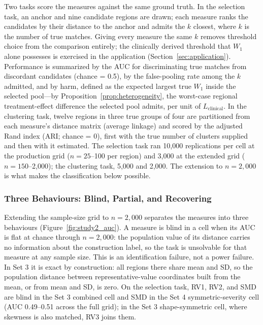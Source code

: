\documentclass[AMA,Times1COL]{WileyNJDv5}
\begin{document}
Two tasks score the measures against the same ground truth. In the selection task, an anchor and nine candidate regions are drawn; each measure ranks the candidates by their distance to the anchor and admits the $k$ closest, where $k$ is the number of true matches. Giving every measure the same $k$ removes threshold choice from the comparison entirely; the clinically derived threshold that $W_1$ alone possesses is exercised in the application (Section~\ref{sec:application}). Performance is summarized by the AUC for discriminating true matches from discordant candidates (chance = 0.5), by the false-pooling rate among the $k$ admitted, and by harm, defined as the expected largest true $W_1$ inside the selected pool---by Proposition~\ref{prop:heterogeneity}, the worst-case regional treatment-effect difference the selected pool admits, per unit of $L_{\text{clinical}}$. In the clustering task, twelve regions in three true groups of four are partitioned from each measure's distance matrix (average linkage) and scored by the adjusted Rand index (ARI; chance = 0), first with the true number of clusters supplied and then with it estimated. The selection task ran 10{,}000 replications per cell at the production grid ($n = 25$--100 per region) and 3{,}000 at the extended grid ($n = 150$--2{,}000); the clustering task, 5{,}000 and 2{,}000. The extension to $n = 2{,}000$ is what makes the classification below possible.

\subsubsection{Three Behaviours: Blind, Partial, and Recovering}\label{sec:study2_classification}

Extending the sample-size grid to $n = 2{,}000$ separates the measures into three behaviours (Figure~\ref{fig:study2_auc}). A measure is blind in a cell when its AUC is flat at chance through $n = 2{,}000$: the population value of its distance carries no information about the construction label, so the task is unsolvable for that measure at any sample size. This is an identification failure, not a power failure. In Set 3 it is exact by construction: all regions there share mean and SD, so the population distance between representative-value coordinates built from the mean, or from mean and SD, is zero. On the selection task, RV1, RV2, and SMD are blind in the Set 3 combined cell and SMD in the Set 4 symmetric-severity cell (AUC 0.49--0.51 across the full grid); in the Set 3 shape-symmetric cell, where skewness is also matched, RV3 joins them.
\end{document}
